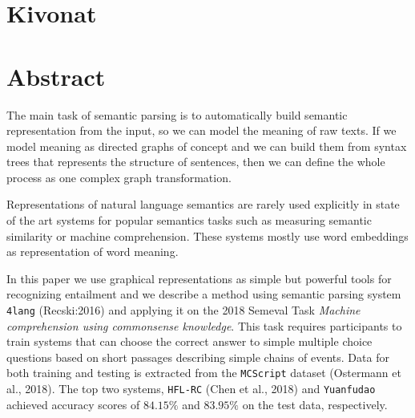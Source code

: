 \chapter*{Kivonat}



\vfill

\chapter*{Abstract}
The main task of semantic parsing is to automatically build semantic representation from the input, so we can model the meaning
of raw texts. If we model meaning as directed graphs of concept and we can build them from syntax trees that represents the structure of 
sentences, then we can define the whole process as one complex graph transformation.

Representations of natural language semantics
are rarely used explicitly in state of the art systems
for popular semantics tasks such as measuring semantic
similarity or machine comprehension. These systems mostly use word embeddings as representation of word meaning.

In this paper we use graphical representations as simple but powerful tools for recognizing entailment and we describe a method using semantic parsing system \texttt{4lang} (Recski:2016) and applying it on
the 2018 Semeval Task \textit{Machine comprehension using commonsense
knowledge}. This task 
requires participants
to train systems that can choose the correct
answer to simple multiple choice questions
based on short passages describing simple chains
of events. Data for both training and testing is extracted
from the \texttt{MCScript} dataset (Ostermann
et al., 2018). The top two systems, \texttt{HFL-RC} (Chen
et al., 2018) and \texttt{Yuanfudao}
achieved accuracy scores of $84.15\%$ and $83.95\%$
on the test data, respectively.

